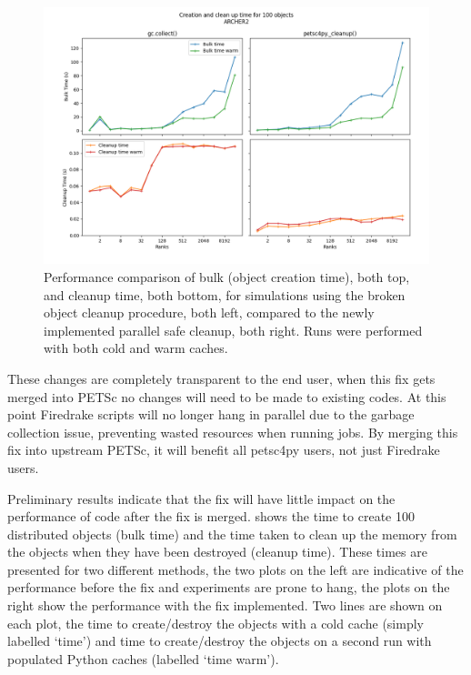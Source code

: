 \documentclass[a4paper,11pt]{article}
\begin{document}
\begin{figure}[htp]
	\centering
	\includegraphics[width=\textwidth]{D100BS128B_222.png}
	\vspace{-1em}
	\caption{Performance comparison of bulk (object creation time), both top, and cleanup time, both bottom, for simulations using the broken object cleanup procedure, both left, compared to the newly implemented parallel safe cleanup, both right. Runs were performed with both cold and warm caches.}
	\label{fig:perf_comp}
\end{figure}

These changes are completely transparent to the end user, when this fix gets merged into PETSc no changes will need to be made to existing codes.
At this point Firedrake scripts will no longer hang in parallel due to the garbage collection issue, preventing wasted resources when running jobs.
By merging this fix into upstream PETSc, it will benefit all petsc4py users, not just Firedrake users.

Preliminary results indicate that the fix will have little impact on the performance of code after the fix is merged.
 shows the time to create 100 distributed objects (bulk time) and the time taken to clean up the memory from the objects when they have been destroyed (cleanup time).
These times are presented for two different methods, the two plots on the left are indicative of the performance before the fix and experiments are prone to hang, the plots on the right show the performance with the fix implemented.
Two lines are shown on each plot, the time to create/destroy the objects with a cold cache (simply labelled `time') and time to create/destroy the objects on a second run with populated Python caches (labelled `time warm').
\end{document}
